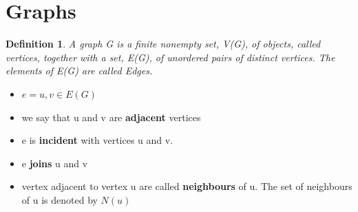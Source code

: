 \documentclass[10pt, a4paper]{article}
\newcommand\course{XXXX0000}                            %
\newcommand\hwnumber{0}                                 %
\newcommand\Information{Someone}                        %
\newtheorem*{defn}{Definition}
\begin{document}
            
            
            
            
        
            
        
            
            
        
        
            

\newpage

\section{Graphs}
\begin{defn}
A graph G is a finite nonempty set, V(G), of objects, called vertices, together with a set, E(G), of unordered pairs of distinct vertices. The elements of E(G) are called Edges. 
\end{defn}
\begin{term}
\begin{itemize}
    \item $e = {u,v} \in E(G)$
    \item we say that u and v are \textbf{adjacent} vertices
    \item e is \textbf{incident} with vertices u and v.
    \item e \textbf{joins} u and v 
    \item vertex adjacent to vertex u are called \textbf{neighbours} of u. The set of neighbours of u is denoted by $N(u)$
\end{itemize}
\end{term}
\end{document}
